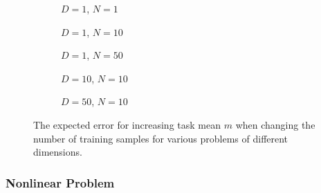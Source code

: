 \begin{figure}[!h]
  \centering
    \begin{subfigure}{0.3\textwidth}
      \centering
      \caption{$D=1$, $N=1$}
      \label{fig:linear-m-N-1-D-1}
    \end{subfigure}
    \begin{subfigure}{0.3\textwidth}
      \centering
      \caption{$D=1$, $N=10$}
      \label{fig:linear-m-N-10-D-1}
    \end{subfigure}
    \begin{subfigure}{0.3\textwidth}
      \centering
      \caption{$D=1$, $N=50$}
      \label{fig:linear-m-N-50-D-1}
    \end{subfigure}

    \begin{subfigure}{0.3\textwidth}
      \centering
      \caption{$D=10$, $N=10$}
      \label{fig:linear-m-N-10-D-10}
    \end{subfigure}
    \begin{subfigure}{0.3\textwidth}
      \centering
      \caption{$D=50$, $N=10$}
      \label{fig:linear-m-N-10-D-50}
    \end{subfigure}  

  \caption{The expected error for increasing task mean $m$ when changing the number of training samples for various problems of different dimensions.}
  \label{fig:linear-m}
\end{figure}

\subsubsection{Nonlinear Problem}

